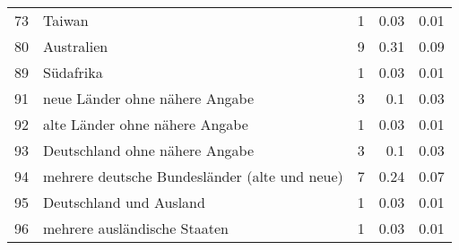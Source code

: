 \begin{longtable}{lXrrr}
        73 & \multicolumn{1}{X}{Taiwan} & %
          \num{1} &
          \num[round-mode=places,round-precision=2]{0,03} &
          \num[round-mode=places,round-precision=2]{0,01} \\

        80 & \multicolumn{1}{X}{Australien} & %
          \num{9} &
          \num[round-mode=places,round-precision=2]{0,31} &
          \num[round-mode=places,round-precision=2]{0,09} \\

        89 & \multicolumn{1}{X}{Südafrika} & %
          \num{1} &
          \num[round-mode=places,round-precision=2]{0,03} &
          \num[round-mode=places,round-precision=2]{0,01} \\

        91 & \multicolumn{1}{X}{neue Länder ohne nähere Angabe} & %
          \num{3} &
          \num[round-mode=places,round-precision=2]{0,1} &
          \num[round-mode=places,round-precision=2]{0,03} \\

        92 & \multicolumn{1}{X}{alte Länder ohne nähere Angabe} & %
          \num{1} &
          \num[round-mode=places,round-precision=2]{0,03} &
          \num[round-mode=places,round-precision=2]{0,01} \\

        93 & \multicolumn{1}{X}{Deutschland ohne nähere Angabe} & %
          \num{3} &
          \num[round-mode=places,round-precision=2]{0,1} &
          \num[round-mode=places,round-precision=2]{0,03} \\

        94 & \multicolumn{1}{X}{mehrere deutsche Bundesländer (alte und neue)} & %
          \num{7} &
          \num[round-mode=places,round-precision=2]{0,24} &
          \num[round-mode=places,round-precision=2]{0,07} \\

        95 & \multicolumn{1}{X}{Deutschland und Ausland} & %
          \num{1} &
          \num[round-mode=places,round-precision=2]{0,03} &
          \num[round-mode=places,round-precision=2]{0,01} \\

        96 & \multicolumn{1}{X}{mehrere ausländische Staaten} & %
          \num{1} &
          \num[round-mode=places,round-precision=2]{0,03} &
          \num[round-mode=places,round-precision=2]{0,01} \\


\end{longtable}

